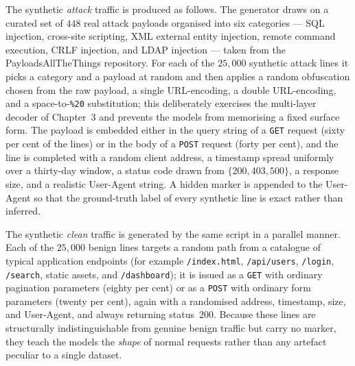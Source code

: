 \documentclass[../main.tex]{subfiles}
\begin{document}
The synthetic \emph{attack} traffic is produced as follows. The generator
draws on a curated set of $448$ real attack payloads organised into six
categories --- SQL injection, cross-site scripting, XML external entity
injection, remote command execution, CRLF injection, and LDAP injection ---
taken from the PayloadsAllTheThings repository. For each of the $25{,}000$
synthetic attack lines it picks a category and a payload at random and then
applies a random obfuscation chosen from the raw payload, a single
URL-encoding, a double URL-encoding, and a space-to-\texttt{\%20}
substitution; this deliberately exercises the multi-layer decoder of
Chapter~3 and prevents the models from memorising a fixed surface form. The
payload is embedded either in the query string of a \texttt{GET} request
(sixty per cent of the lines) or in the body of a \texttt{POST} request
(forty per cent), and the line is completed with a random client address, a
timestamp spread uniformly over a thirty-day window, a status code drawn from
$\{200,403,500\}$, a response size, and a realistic User-Agent string. A
hidden marker is appended to the User-Agent so that the ground-truth label of
every synthetic line is exact rather than inferred.

The synthetic \emph{clean} traffic is generated by the same script in a
parallel manner. Each of the $25{,}000$ benign lines targets a random path
from a catalogue of typical application endpoints (for example
\texttt{/index.html}, \texttt{/api/users}, \texttt{/login}, \texttt{/search},
static assets, and \texttt{/dashboard}); it is issued as a \texttt{GET} with
ordinary pagination parameters (eighty per cent) or as a \texttt{POST} with
ordinary form parameters (twenty per cent), again with a randomised address,
timestamp, size, and User-Agent, and always returning status~$200$. Because
these lines are structurally indistinguishable from genuine benign traffic
but carry no marker, they teach the models the \emph{shape} of normal requests
rather than any artefact peculiar to a single dataset.
\end{document}
